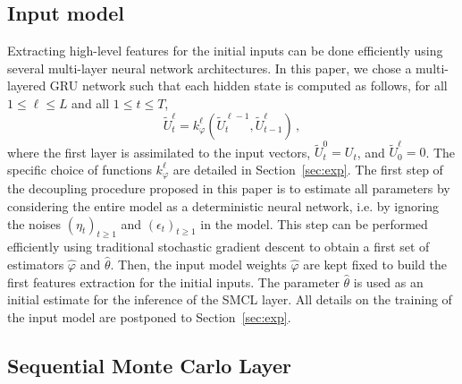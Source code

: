\documentclass{article}
\begin{document}
\subsection{Input model}%
\label{sub:input_model}
Extracting high-level features for the initial inputs can be done efficiently using several multi-layer neural network architectures.  In this paper, we chose a multi-layered GRU network such that each hidden state is computed as follows, for all $1 \leq \ell \leq L$ and all $1 \leq t \leq T$,
$$
	\tilde U^\ell_t = k_\varphi^\ell(\widetilde U^{\ell-1}_t, \widetilde U^\ell_{t-1})\,,
$$
where the first layer is assimilated to the input vectors, $\widetilde U_t^0 = U_t$, and  $\widetilde U^\ell_0 = 0$. The specific choice of functions $ k_\varphi^\ell$ are detailed in Section~\ref{sec:exp}.
The first step of the decoupling procedure proposed in this paper is to estimate all parameters by considering the entire model as a deterministic neural network, i.e. by ignoring the noises $(\eta_t)_{t\geq 1}$ and $(\epsilon_t)_{t\geq 1}$ in the model. This step can be performed efficiently using traditional stochastic gradient descent to obtain a first set of estimators $\widehat \varphi$ and $ \widehat \theta$. Then, the input model weights $\widehat\varphi$ are kept fixed to build the first features extraction for the initial inputs. The parameter $ \widehat \theta$ is used as an initial estimate for the inference of  the SMCL layer. All details on the training of the input model are postponed to Section~\ref{sec:exp}.

\subsection{Sequential Monte Carlo Layer}%
\label{sub:uncertainty_estimation}
\end{document}
